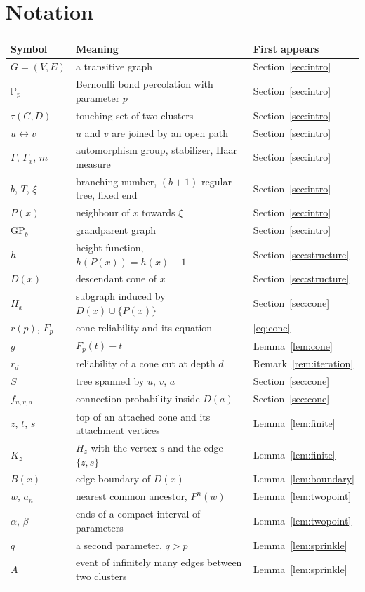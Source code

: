 \documentclass[11pt]{amsart}
\theoremstyle{remark}
\newcommand{\PP}{\mathbb{P}}
\newcommand{\GP}{\mathrm{GP}_b}
\begin{document}
\appendix
\section{Notation}\label{app:notation}

\begin{center}
\begin{tabular}{p{3.0cm}p{8.0cm}p{3.1cm}}
\toprule
Symbol & Meaning & First appears\\
\midrule
$G=(V,E)$ & a transitive graph & Section~\ref{sec:intro}\\
$\PP_p$ & Bernoulli bond percolation with parameter $p$ & Section~\ref{sec:intro}\\
$\tau(C,D)$ & touching set of two clusters & Section~\ref{sec:intro}\\
$u\leftrightarrow v$ & $u$ and $v$ are joined by an open path & Section~\ref{sec:intro}\\
$\Gamma$, $\Gamma_x$, $m$ & automorphism group, stabilizer, Haar measure & Section~\ref{sec:intro}\\
$b$, $T$, $\xi$ & branching number, $(b+1)$-regular tree, fixed end & Section~\ref{sec:intro}\\
$P(x)$ & neighbour of $x$ towards $\xi$ & Section~\ref{sec:intro}\\
$\GP$ & grandparent graph & Section~\ref{sec:intro}\\
$h$ & height function, $h(P(x))=h(x)+1$ & Section~\ref{sec:structure}\\
$D(x)$ & descendant cone of $x$ & Section~\ref{sec:structure}\\
$H_x$ & subgraph induced by $D(x)\cup\{P(x)\}$ & Section~\ref{sec:cone}\\
$r(p)$, $F_p$ & cone reliability and its equation & \eqref{eq:cone}\\
$g$ & $F_p(t)-t$ & Lemma~\ref{lem:cone}\\
$r_d$ & reliability of a cone cut at depth $d$ & Remark~\ref{rem:iteration}\\
$S$ & tree spanned by $u$, $v$, $a$ & Section~\ref{sec:cone}\\
$f_{u,v,a}$ & connection probability inside $D(a)$ & Section~\ref{sec:cone}\\
$z$, $t$, $s$ & top of an attached cone and its attachment vertices & Lemma~\ref{lem:finite}\\
$K_z$ & $H_z$ with the vertex $s$ and the edge $\{z,s\}$ & Lemma~\ref{lem:finite}\\
$B(x)$ & edge boundary of $D(x)$ & Lemma~\ref{lem:boundary}\\
$w$, $a_n$ & nearest common ancestor, $P^n(w)$ & Lemma~\ref{lem:twopoint}\\
$\alpha$, $\beta$ & ends of a compact interval of parameters & Lemma~\ref{lem:twopoint}\\
$q$ & a second parameter, $q>p$ & Lemma~\ref{lem:sprinkle}\\
$A$ & event of infinitely many edges between two clusters & Lemma~\ref{lem:sprinkle}\\
\bottomrule
\end{tabular}
\end{center}
\end{document}

